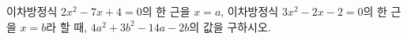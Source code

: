 이차방정식 $2x^2-7x+4=0$의 한 근을 $x=a$, 이차방정식 $3x^2-2x-2=0$의 한 근을 $x=b$라 할 때, $4a^2+3b^2-14a-2b$의 값을 구하시오.
